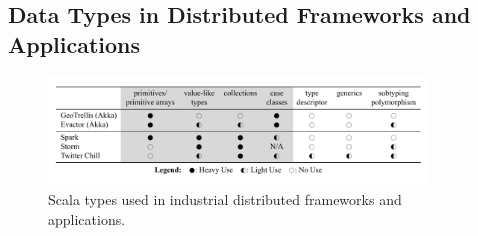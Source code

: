 \documentclass[preprint,10pt]{sigplanconf}
\theoremstyle{definition}
\theoremstyle{definition}
\begin{document}
\subsection{Data Types in Distributed Frameworks and Applications}
\label{sec:data-types-in-distributed-applications}

\begin{figure}[ht!]
 \centering
 \includegraphics[width=0.9\textwidth]{application-table.pdf}
 \vspace{-1em}
 \caption{Scala types used in industrial distributed frameworks and applications.}
 \label{fig:application-table}
\end{figure}

\end{document}
